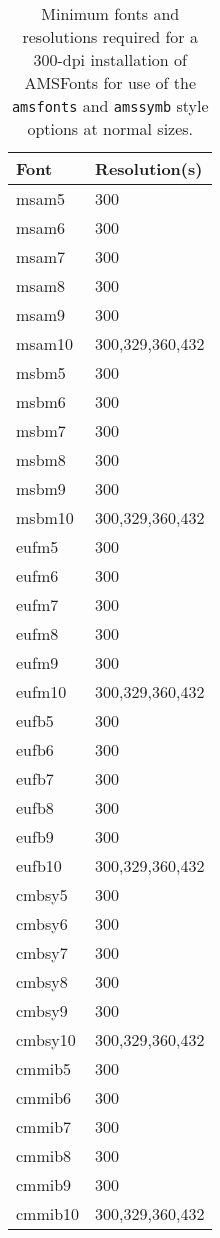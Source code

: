 \begin{table}
\caption{Minimum fonts and resolutions required for a 300-dpi installation
of AMSFonts for use of the {\tt amsfonts} and {\tt amssymb} style options
at normal \REVTeX{} sizes.}
\begin{tabular}{@{\hspace{.4in}}ll@{\hspace{.4in}}}
Font & Resolution(s) \\
\hline
  msam5 & 300 \\
  msam6 & 300 \\
  msam7 & 300 \\
  msam8 & 300 \\
  msam9 & 300 \\
  msam10 & 300,329,360,432 \\
  msbm5 & 300 \\
  msbm6 & 300 \\
  msbm7 & 300 \\
  msbm8 & 300 \\
  msbm9 & 300 \\
  msbm10 & 300,329,360,432 \\
  eufm5 & 300 \\
  eufm6 & 300 \\
  eufm7 & 300 \\
  eufm8 & 300 \\
  eufm9 & 300 \\
  eufm10 & 300,329,360,432 \\
  eufb5 & 300 \\
  eufb6 & 300 \\
  eufb7 & 300 \\
  eufb8 & 300 \\
  eufb9 & 300 \\
  eufb10 & 300,329,360,432 \\
  cmbsy5 & 300 \\
  cmbsy6 & 300 \\
  cmbsy7 & 300 \\
  cmbsy8 & 300 \\
  cmbsy9 & 300 \\
  cmbsy10 & 300,329,360,432 \\
  cmmib5 & 300 \\
  cmmib6 & 300 \\
  cmmib7 & 300 \\
  cmmib8 & 300 \\
  cmmib9 & 300 \\
  cmmib10 & 300,329,360,432 \\
\end{tabular}
\end{table}

